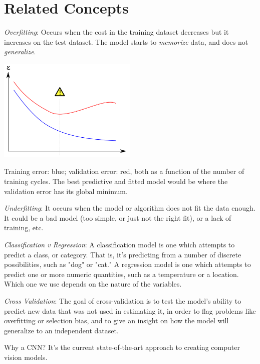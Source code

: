 \section{Related Concepts}
\textit{Overfitting}: Occurs when the cost in the training dataset decreases but it increases on the test dataset. The model starts to \textit{memorize} data, and does not \textit{generalize}.
\begin{center}
\includegraphics[width=0.5\textwidth]{overfitting.png}
\end{center}

Training error: blue; validation error: red, both as a function of the number of training cycles. The best predictive and fitted model would be where the validation error has its global minimum.

\textit{Underfitting}: It occurs when the model or algorithm does not fit the data enough. It could be a bad model (too simple, or just not the right fit), or a lack of training, etc.

\textit{Classification v Regression}: A classification model is one which attempts to predict a class, or category. That is, it's predicting from a number of discrete possibilities, such as "dog" or "cat." A regression model is one which attempts to predict one or more numeric quantities, such as a temperature or a location. Which one we use depends on the nature of the variables.

\textit{Cross Validation}: The goal of cross-validation is to test the model's ability to predict new data that was not used in estimating it, in order to flag problems like overfitting or selection bias, and to give an insight on how the model will generalize to an independent dataset.

Why a CNN? It's the current state-of-the-art approach to creating computer vision models.

